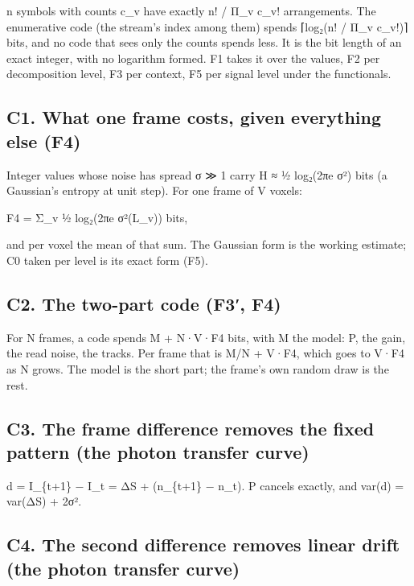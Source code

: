 n symbols with counts c\_\allowbreak{}v have exactly n! / Π\_\allowbreak{}v c\_\allowbreak{}v! arrangements. The enumerative code (the stream's index among them) spends ⌈log₂(n! / Π\_\allowbreak{}v c\_\allowbreak{}v!)⌉ bits, and no code that sees only the counts spends less. It is the bit length of an exact integer, with no logarithm formed. F1 takes it over the values, F2 per decomposition level, F3 per context, F5 per signal level under the functionals.

\subsection{\texorpdfstring{C1. What one frame costs, given everything else (F4)}{C1. What one frame costs, given everything else (F4)}}

Integer values whose noise has spread σ ≫ 1 carry H ≈ ½ log₂(2πe σ²) bits (a Gaussian's entropy at unit step). For one frame of V voxels:

F4 = Σ\_\allowbreak{}v ½ log₂(2πe σ²(L\_\allowbreak{}v)) bits,

and per voxel the mean of that sum. The Gaussian form is the working estimate; C0 taken per level is its exact form (F5).

\subsection{\texorpdfstring{C2. The two-part code (F3′, F4)}{C2. The two-part code (F3′, F4)}}

For N frames, a code spends M + N·V·F4 bits, with M the model: P, the gain, the read noise, the tracks. Per frame that is M/N + V·F4, which goes to V·F4 as N grows. The model is the short part; the frame's own random draw is the rest.

\subsection{\texorpdfstring{C3. The frame difference removes the fixed pattern (the photon transfer curve)}{C3. The frame difference removes the fixed pattern (the photon transfer curve)}}

d = I\_\allowbreak{}\{t+1\} − I\_\allowbreak{}t = ΔS + (n\_\allowbreak{}\{t+1\} − n\_\allowbreak{}t). P cancels exactly, and var(d) = var(ΔS) + 2σ².

\subsection{\texorpdfstring{C4. The second difference removes linear drift (the photon transfer curve)}{C4. The second difference removes linear drift (the photon transfer curve)}}

